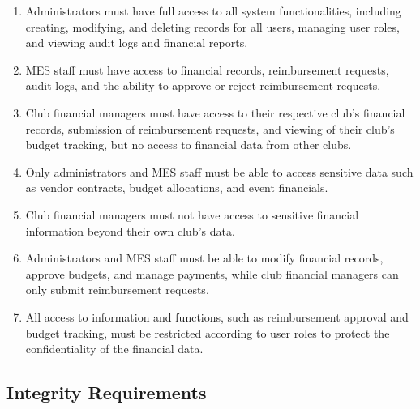 \documentclass[12pt]{article}
\begin{document}
\begin{enumerate}
  \item Administrators must have full access to all system functionalities, including creating, modifying, and deleting records for all users, managing user roles, and viewing audit logs and financial reports.
  \item MES staff must have access to financial records, reimbursement requests, audit logs, and the ability to approve or reject reimbursement requests.
  \item Club financial managers must have access to their respective club's financial records, submission of reimbursement requests, and viewing of their club's budget tracking, but no access to financial data from other clubs.
  \item Only administrators and MES staff must be able to access sensitive data such as vendor contracts, budget allocations, and event financials.
  \item Club financial managers must not have access to sensitive financial information beyond their own club's data.
  \item Administrators and MES staff must be able to modify financial records, approve budgets, and manage payments, while club financial managers can only submit reimbursement requests.
  \item All access to information and functions, such as reimbursement approval and budget tracking, must be restricted according to user roles to protect the confidentiality of the financial data.
\end{enumerate}

\subsection{Integrity Requirements}
\end{document}

